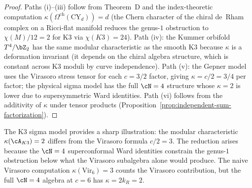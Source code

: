 \begin{proof}
Paths (i)--(iii) follow from Theorem~D and the index-theoretic
computation $\kappa(\Omega^{\mathrm{ch}}(\mathrm{CY}_d)) = d$
(the Chern character of the chiral de~Rham complex on a Ricci-flat
manifold reduces the genus-$1$ obstruction to $\chi(M)/12 = 2$
for K3 via $\chi(K3) = 24$). Path (iv): the Kummer orbifold
$T^4/\bZ_2$ has the same modular characteristic as the smooth K3
because $\kappa$ is a deformation invariant (it depends on the
chiral algebra structure, which is constant across K3 moduli by
curve independence). Path (v): the Gepner model uses the Virasoro
stress tensor for each $c = 3/2$ factor, giving $\kappa = c/2 = 3/4$
per factor; the physical sigma model has the full $\cN = 4$
structure whose $\kappa = 2$ is lower due to supersymmetric
Ward identities. Path (vi) follows from the additivity of $\kappa$
under tensor products
(Proposition~\ref{prop:independent-sum-factorization}).
\end{proof}

\begin{remark}[$\kappa(K3) = 2 \neq c/2 = 3$: modular characteristic vs central charge]
\label{rem:ap48-k3}
The K3 sigma model provides a sharp illustration: the
modular characteristic $\kappa(\cA_{K3}) = 2$ differs from the
Virasoro formula $c/2 = 3$. The reduction arises because the
$\cN = 4$ superconformal Ward identities constrain the genus-$1$
obstruction below what the Virasoro subalgebra alone would produce.
The naive Virasoro computation $\kappa(\mathrm{Vir}_6) = 3$ counts
the Virasoro contribution, but the full $\cN = 4$ algebra at $c = 6$
has $\kappa = 2k_R = 2$.
\end{remark}


